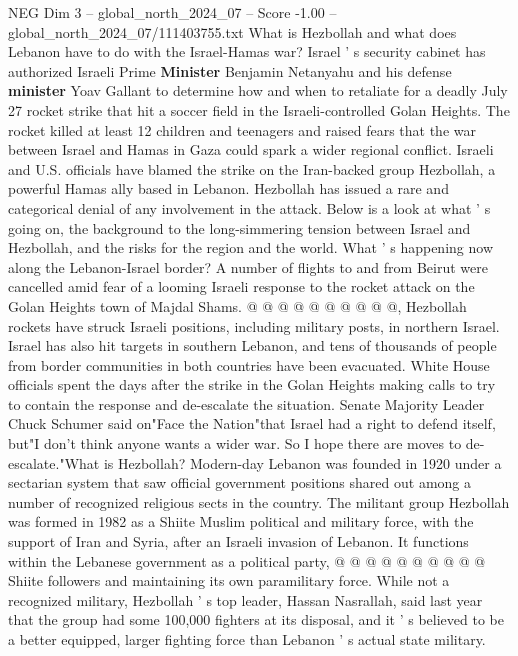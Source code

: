 \begin{textsample}{NEG Dim 3 – global\_north\_2024\_07 – Score -1.00 – global\_north\_2024\_07/111403755.txt}  \label{ex:f3_neg_377}
What is Hezbollah and what does Lebanon have to do with the Israel-Hamas war?
Israel ' s security cabinet has authorized Israeli Prime \textbf{Minister} Benjamin Netanyahu and his defense \textbf{minister} Yoav Gallant to determine how and when to retaliate for a deadly July 27 rocket strike that hit a soccer field in the Israeli-controlled Golan Heights.
The rocket killed at least 12 children and teenagers and raised fears that the war between Israel and Hamas in Gaza could spark a wider regional conflict.
Israeli and U.S. officials have blamed the strike on the Iran-backed group Hezbollah, a powerful Hamas ally based in Lebanon.
Hezbollah has issued a rare and categorical denial of any involvement in the attack.
Below is a look at what ' s going on, the background to the long-simmering tension between Israel and Hezbollah, and the risks for the region and the world.
What ' s happening now along the Lebanon-Israel border?
A number of flights to and from Beirut were cancelled amid fear of a looming Israeli response to the rocket attack on the Golan Heights town of Majdal Shams. @ @ @ @ @ @ @ @ @ @, Hezbollah rockets have struck Israeli positions, including military posts, in northern Israel.
Israel has also hit targets in southern Lebanon, and tens of thousands of people from border communities in both countries have been evacuated.
White House officials spent the days after the strike in the Golan Heights making calls to try to contain the response and de-escalate the situation.
Senate Majority Leader Chuck Schumer said on"Face the Nation"that Israel had a right to defend itself, but"I don't think anyone wants a wider war.
So I hope there are moves to de-escalate."What is Hezbollah?
Modern-day Lebanon was founded in 1920 under a sectarian system that saw official government positions shared out among a number of recognized religious sects in the country.
The militant group Hezbollah was formed in 1982 as a Shiite Muslim political and military force, with the support of Iran and Syria, after an Israeli invasion of Lebanon.
It functions within the Lebanese government as a political party, @ @ @ @ @ @ @ @ @ @ Shiite followers and maintaining its own paramilitary force.
While not a recognized military, Hezbollah ' s top leader, Hassan Nasrallah, said last year that the group had some 100,000 fighters at its disposal, and it ' s believed to be a better equipped, larger fighting force than Lebanon ' s actual state military.

\end{textsample}
